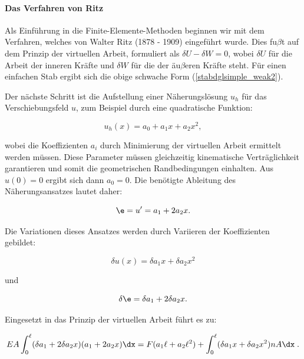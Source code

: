 \paragraph{Das Verfahren von Ritz}

Als Einführung in die Finite-Elemente-Methoden beginnen wir mit dem Verfahren, welches von Walter Ritz (1878 - 1909) eingeführt wurde. Dies fu$\beta$t auf dem Prinzip der virtuellen Arbeit, formuliert als $\delta U - \delta W = 0$, wobei $\delta U$ für die Arbeit der inneren Kräfte und $\delta W$ für die der äu$\beta$eren Kräfte steht. Für einen einfachen Stab ergibt sich die obige schwache Form (\ref{stabdglsimple_weak2}).

Der nächste Schritt ist die Aufstellung einer Näherungslösung $u_h$ für das Verschiebungsfeld $u$, zum Beispiel durch eine quadratische Funktion:

\begin{equation}
u_h(x) = a_0 + a_1 x + a_2 x^2,
\end{equation}

wobei die Koeffizienten $a_i$ durch Minimierung der virtuellen Arbeit ermittelt werden müssen. Diese Parameter müssen gleichzeitig kinematische Verträglichkeit garantieren und somit die geometrischen Randbedingungen einhalten. Aus $u(0) = 0$ ergibt sich dann $a_0 = 0$. Die benötigte Ableitung des Näherungsansatzes lautet daher:

\begin{equation}
\e = u^{\prime} = a_1 + 2a_2 x.
\end{equation}

Die Variationen dieses Ansatzes werden durch Variieren der Koeffizienten gebildet:

\begin{equation}
\delta u(x) = \delta a_1 x + \delta a_2 x^2
\end{equation}

und

\begin{equation}
\delta \e= \delta a_1 + 2 \delta a_2 x.
\end{equation}

Eingesetzt in das Prinzip der virtuellen Arbeit führt es zu:

\begin{equation}
EA \int_0^{\ell} (\delta a_1 + 2 \delta a_2 x) (a_1 +2 a_2 x) \dx = F (a_1 \ell +a_2 \ell^2) + \int_0^{\ell} (\delta a_1 x + \delta a_2 x^2) n A \dx \; .
\end{equation}

